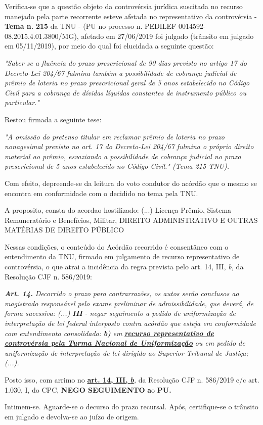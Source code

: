 \documentclass[12pt]{article}
\begin{document}
\justifying
\noindent Verifica-se que a questão objeto da controvérsia jurídica suscitada no recurso manejado pela parte recorrente esteve afetada no representativo da controvérsia - \textbf{Tema n. }\textbf{215} da TNU - (PU no processo n. PEDILEF 0014592-08.2015.4.01.3800/MG),  afetado em 27/06/2019 foi julgado (trânsito em julgado em 05/11/2019), por meio do qual foi elucidada a seguinte questão:

\noindent \textit{"Saber se a fluência do prazo prescricional de 90 dias previsto no artigo 17 do Decreto-Lei 204/67 fulmina também a possibilidade de cobrança judicial de prêmio de loteria no prazo prescricional geral de 5 anos estabelecido no Código Civil para a cobrança de dívidas líquidas constantes de instrumento público ou particular."}

\noindent Restou firmada a seguinte tese:

\noindent \textit{"A omissão do pretenso titular em reclamar prêmio de loteria no prazo nonagesimal previsto no art. 17 do Decreto-Lei 204/67 fulmina o próprio direito material ao prêmio, esvaziando a possibilidade de cobrança judicial no prazo prescricional de 5 anos estabelecido no Código Civil." (Tema 215 TNU).}

\noindent Com efeito, depreende-se da leitura do voto condutor do acórdão que o mesmo se encontra em conformidade com o decidido no  tema pela TNU.

\noindent A proposito, consta do acordao hostilizado: (...) Licença Prêmio, Sistema Remuneratório e Benefícios, Militar, DIREITO ADMINISTRATIVO E OUTRAS MATÉRIAS DE DIREITO PÚBLICO

\noindent Nessas condições, o conteúdo do Acórdão recorrido é consentâneo com o entendimento da TNU, firmado em julgamento de recurso representativo de controvérsia, o que atrai a incidência da regra prevista pelo art. 14, III, \textit{b,} da Resolução CJF n. 586/2019:

\noindent \textit{\textbf{Art. 14.}}\textit{ Decorrido o prazo para contrarrazões, os autos serão conclusos ao magistrado responsável pelo exame preliminar de admissibilidade, que deverá, de forma sucessiva: (...) }\textit{\textbf{III }}\textit{- negar seguimento a pedido de uniformização de interpretação de lei federal interposto contra acórdão que esteja em conformidade com entendimento consolidado: }\textit{\textbf{b)}}\textit{ em }\uline{\textit{\textbf{recurso representativo de controvérsia pela Turma Nacional de Uniformização}}}\textit{ ou em pedido de uniformização de interpretação de lei dirigido ao Superior Tribunal de Justiça;(...).}

\noindent Posto isso, com arrimo no \uline{\textbf{art. 14, III, }}\uline{\textit{\textbf{b}}}\textit{,} da Resolução CJF n. 586/2019 c/c art. 1.030, I, do CPC, \textbf{NEGO SEGUIMENTO }\textbf{a}o\textbf{ PU}\textbf{.}

\noindent Intimem-se. Aguarde-se o decurso do prazo recursal. Após, certifique-se o trânsito em julgado e devolva-se ao juízo de origem.
\end{document}
